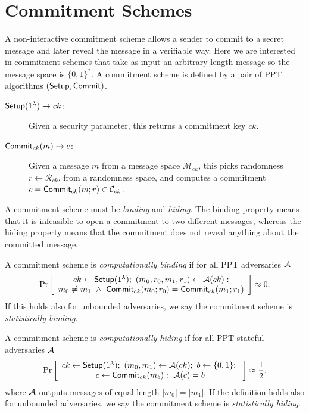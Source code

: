 \section{Commitment Schemes}
\label{sec:BComDef}
A non-interactive commitment scheme allows a sender to commit to a secret message and later reveal the message in a verifiable way. Here we are interested in commitment schemes that take as input an arbitrary length message so the message space is $\{0,1\}^*$. A commitment scheme is defined by a pair of PPT algorithms $(\mathsf{Setup},\mathsf{Commit})$.
\begin{description}
\item [$\mathsf{Setup}(1^{\lambda})\to ck$:]
Given a security parameter, this returns a commitment key $ck$.
\item [$\mathsf{Commit}_{ck}(m)\to c$:] Given a message $m$ from a message space $\mathcal{M}_{ck}$, this picks randomness $r\gets \mathcal{R}_{ck}$, from a randomness space, and computes a commitment $c=\mathsf{Commit}_{ck}(m;r) \in \mathcal{C}_{ck}$. 
\end{description}
A commitment scheme must be \emph{binding} and \emph{hiding}. The binding property means that it is infeasible to open a commitment to two different messages, whereas the hiding property means that the commitment does not reveal anything about the committed message. 
\begin{definition} [Binding]
A commitment scheme is \emph{computationally binding} if for all PPT adversaries $\mathcal{A}$
$$ \Pr\left[
\begin{array}{c}
ck \leftarrow \mathsf{Setup}(1^{\lambda});~ (m_0,r_0,m_1,r_1)\leftarrow \mathcal{A}(ck): \\
m_0\neq m_1 ~\wedge~ \mathsf{Commit}_{ck}(m_0;r_0)=\mathsf{Commit}_{ck}(m_1;r_1)
\end{array}
\right] \approx 0.
$$
If this holds also for unbounded adversaries, we say the commitment scheme is \emph{statistically binding}.
\end{definition}
\begin{definition} [Hiding]
A commitment scheme is \emph{computationally hiding} if for all PPT stateful adversaries $\mathcal{A}$
$$ \Pr\left[\begin{array}{c}ck \leftarrow \mathsf{Setup}(1^{\lambda});~(m_0,m_1)\leftarrow \mathcal{A}(ck);~b \gets \{0,1\};~ \\
c\gets \mathsf{Commit}_{ck}(m_b):~\mathcal{A}(c)=b
\end{array}\right] \approx \frac{1}{2},$$
where $\mathcal{A}$ outputs messages of equal length $|m_0|=|m_1|$.
If the definition holds also for unbounded adversaries, we say the commitment scheme is \emph{statistically hiding}.
\end{definition}

